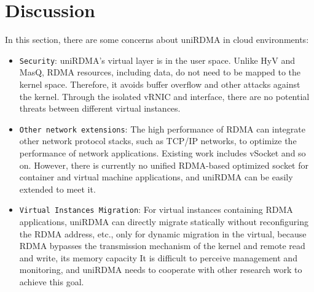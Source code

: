 
\section{Discussion}
In this section, there are some concerns about uniRDMA in cloud environments:
\begin{itemize}
\item {\verb|Security|}: uniRDMA's virtual layer is in the user space. Unlike HyV and MasQ, RDMA resources, including data, do not need to be mapped to the kernel space. Therefore, it avoids buffer overflow and other attacks against the kernel. Through the isolated vRNIC and interface, there are no potential threats between different virtual instances.
\item {\verb|Other network extensions|}: The high performance of RDMA can integrate other network protocol stacks, such as TCP/IP networks, to optimize the performance of network applications. Existing work includes vSocket and so on. However, there is currently no unified RDMA-based optimized socket for container and virtual machine applications, and uniRDMA can be easily extended to meet it.
\item {\verb|Virtual Instances Migration|}: For virtual instances containing RDMA applications, uniRDMA can directly migrate statically without reconfiguring the RDMA address, etc., only for dynamic migration in the virtual, because RDMA bypasses the transmission mechanism of the kernel and remote read and write, its memory capacity It is difficult to perceive management and monitoring, and uniRDMA needs to cooperate with other research work to achieve this goal.
\end{itemize}
